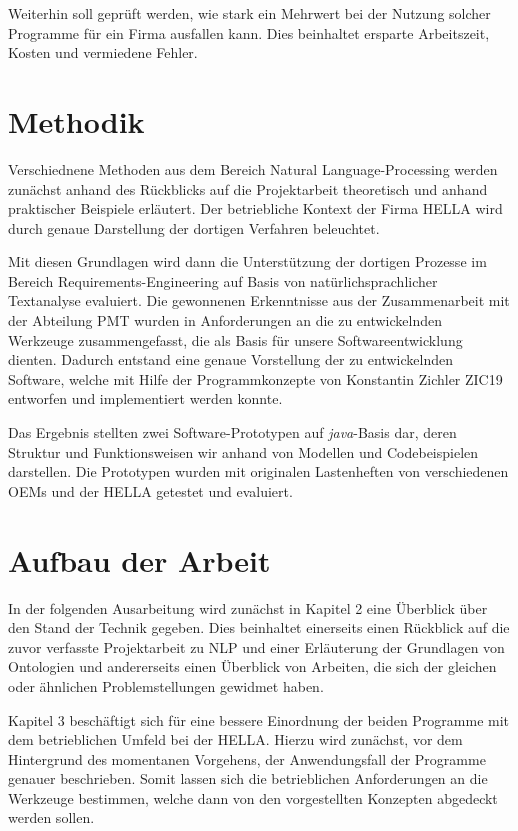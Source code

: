 \documentclass[12pt]{report}
\begin{document}
Weiterhin soll geprüft werden, wie stark ein Mehrwert bei der Nutzung solcher Programme für ein Firma ausfallen kann. Dies beinhaltet ersparte Arbeitszeit, Kosten und vermiedene Fehler. 

\section{Methodik}
Verschiednene Methoden aus dem Bereich Natural Language-Processing werden zunächst anhand des Rückblicks auf die Projektarbeit theoretisch und anhand praktischer Beispiele erläutert. Der betriebliche Kontext der Firma HELLA wird durch genaue Darstellung der dortigen Verfahren beleuchtet. 

Mit diesen Grundlagen wird dann die Unterstützung der dortigen Prozesse im Bereich Requirements-Engineering auf Basis von natürlichsprachlicher Textanalyse evaluiert. Die gewonnenen Erkenntnisse aus der Zusammenarbeit mit der Abteilung PMT wurden in Anforderungen an die zu entwickelnden Werkzeuge zusammengefasst, die als Basis für unsere Softwareentwicklung dienten. Dadurch entstand eine genaue Vorstellung der zu entwickelnden Software, welche mit Hilfe der Programmkonzepte von Konstantin Zichler ZIC19 entworfen und implementiert werden konnte. 

Das Ergebnis stellten zwei Software-Prototypen auf \textit{java}-Basis dar, deren Struktur und Funktionsweisen wir anhand von Modellen und Codebeispielen darstellen. Die Prototypen wurden mit originalen Lastenheften von verschiedenen OEMs und der HELLA getestet und evaluiert.

\section{Aufbau der Arbeit}
In der folgenden Ausarbeitung wird zunächst in Kapitel 2 eine Überblick über den Stand der Technik gegeben. Dies beinhaltet einerseits einen Rückblick auf die zuvor verfasste Projektarbeit zu NLP und einer Erläuterung der Grundlagen von Ontologien und andererseits einen Überblick von Arbeiten, die sich der gleichen oder ähnlichen Problemstellungen gewidmet haben. 

Kapitel 3 beschäftigt sich für eine bessere Einordnung der beiden Programme mit dem betrieblichen Umfeld bei der HELLA. Hierzu wird zunächst, vor dem Hintergrund des momentanen Vorgehens, der Anwendungsfall der Programme genauer beschrieben. Somit lassen sich die betrieblichen Anforderungen an die Werkzeuge bestimmen, welche dann von den vorgestellten Konzepten abgedeckt werden sollen. 
\end{document}
